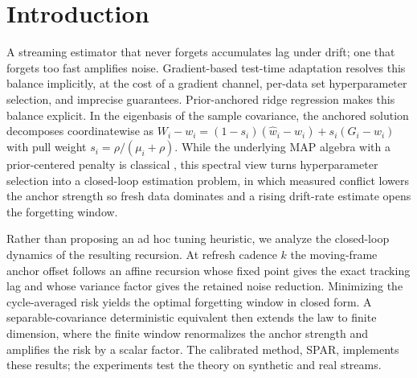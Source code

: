 \documentclass[twoside,11pt]{article}
\begin{document}
\section{Introduction}
A streaming estimator that never forgets accumulates lag under drift; one that forgets too fast amplifies noise.
Gradient-based test-time adaptation \citep{sun2020,wang2021tent} resolves this balance implicitly, at the cost of a gradient channel, per-data set hyperparameter selection, and imprecise guarantees.
Prior-anchored ridge regression makes this balance explicit. In the eigenbasis of the sample covariance, the anchored solution decomposes coordinatewise as $W_i - w_i = (1-s_i)(\widehat w_i - w_i) + s_i(G_i - w_i)$ with pull weight $s_i = \rho/(\mu_i + \rho)$.
While the underlying MAP algebra with a prior-centered penalty is classical \citep{hoerl1970,rasmussen2006,li2018l2sp}, this spectral view turns hyperparameter selection into a closed-loop estimation problem, in which measured conflict lowers the anchor strength so fresh data dominates and a rising drift-rate estimate opens the forgetting window.

Rather than proposing an ad hoc tuning heuristic, we analyze the closed-loop dynamics of the resulting recursion.
At refresh cadence $k$ the moving-frame anchor offset follows an affine recursion whose fixed point gives the exact tracking lag and whose variance factor gives the retained noise reduction.
Minimizing the cycle-averaged risk yields the optimal forgetting window in closed form.
A separable-covariance deterministic equivalent then extends the law to finite dimension, where the finite window renormalizes the anchor strength and amplifies the risk by a scalar factor.
The calibrated method, SPAR, implements these results; the experiments test the theory on synthetic and real streams.
\end{document}
